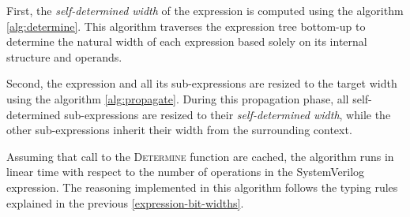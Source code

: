 \documentclass{article}
\newcommand{\sds}{\emph{self-determined width}}
\begin{document}
First, the \sds{} of the expression is computed using the algorithm
\ref{alg:determine}. This algorithm traverses the expression
tree bottom-up to determine the natural width of each expression based solely on
its internal structure and operands.

Second, the expression and all its sub-expressions are resized to the target
width using the algorithm \ref{alg:propagate}. During this
propagation phase, all self-determined sub-expressions are resized to their
\sds{}, while the other sub-expressions inherit their width from the surrounding
context.

Assuming that call to the \textsc{Determine} function are cached, the algorithm
runs in linear time with respect to the number of operations in
the SystemVerilog expression. The reasoning implemented in this algorithm
follows the typing rules explained in the previous
\autoref{expression-bit-widths}.

\newcommand\Determine[1]{\textsc{determine}(#1)}
\newcommand\Propagate[1]{\textsc{propagate}(#1)}
\end{document}
